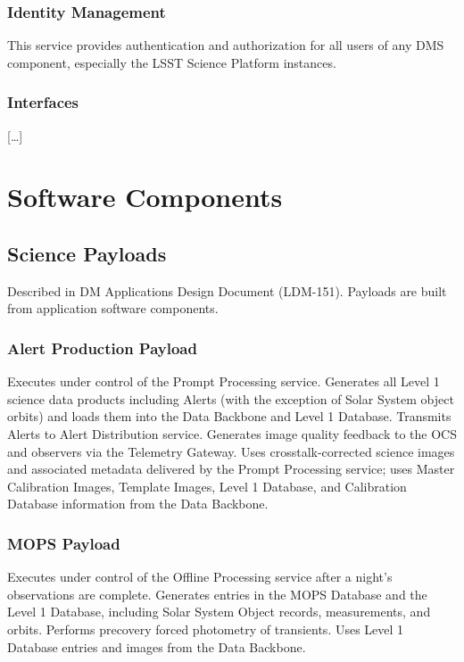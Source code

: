 \documentclass[DM,lsstdraft,toc]{lsstdoc}
\begin{document}
\subsubsection{Identity Management}\label{identity-management}

This service provides authentication and authorization for all users of
any DMS component, especially the LSST Science Platform instances.

\subsubsection{Interfaces}\label{interfaces-5}

{[}\ldots{}{]}

\section{Software Components}\label{software-components}

\subsection{Science Payloads}\label{science-payloads}

Described in DM Applications Design Document (LDM-151). Payloads are
built from application software components.

\subsubsection{Alert Production Payload}\label{alert-production-payload}

Executes under control of the Prompt Processing service. Generates all
Level 1 science data products including Alerts (with the exception of
Solar System object orbits) and loads them into the Data Backbone and
Level 1 Database. Transmits Alerts to Alert Distribution service.
Generates image quality feedback to the OCS and observers via the
Telemetry Gateway. Uses crosstalk-corrected science images and
associated metadata delivered by the Prompt Processing service; uses
Master Calibration Images, Template Images, Level 1 Database, and
Calibration Database information from the Data Backbone.

\subsubsection{MOPS Payload}\label{mops-payload}

Executes under control of the Offline Processing service after a night's
observations are complete. Generates entries in the MOPS Database and
the Level 1 Database, including Solar System Object records,
measurements, and orbits. Performs precovery forced photometry of
transients. Uses Level 1 Database entries and images from the Data
Backbone.
\end{document}
